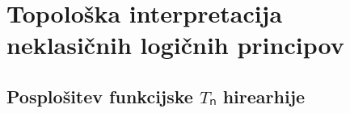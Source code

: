 \section{Topološka interpretacija neklasičnih logičnih principov}
\label{sec:tvl}

\subsection{Posplošitev funkcijske \(Tₙ\) hirearhije}

